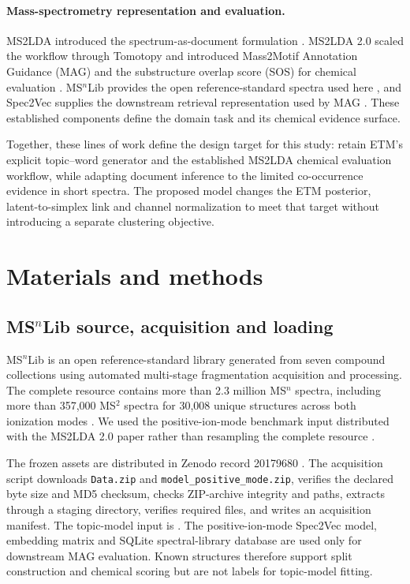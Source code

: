 \documentclass[10pt,a4paper]{article}
\begin{document}
\paragraph{Mass-spectrometry representation and evaluation.}
MS2LDA introduced the spectrum-as-document formulation
\cite{vanderhooft2016}. MS2LDA 2.0 scaled the workflow through Tomotopy and
introduced Mass2Motif Annotation Guidance (MAG) and the substructure overlap
score (SOS) for chemical evaluation \cite{torresortega2026}. MS$^{n}$Lib
provides the open reference-standard spectra used here \cite{brungs2025}, and
Spec2Vec supplies the downstream retrieval representation used by MAG
\cite{huber2021}. These established components define the domain task and its
chemical evidence surface.

Together, these lines of work define the design target for this study: retain
ETM's explicit topic--word generator and the established MS2LDA chemical
evaluation workflow, while adapting document inference to the limited
co-occurrence evidence in short spectra. The proposed model changes the ETM
posterior, latent-to-simplex link and channel normalization to meet that target
without introducing a
separate clustering objective.

\section{Materials and methods}

\subsection{MS\texorpdfstring{$^{n}$}{n}Lib source, acquisition and loading}

MS$^{n}$Lib is an open reference-standard library generated from seven compound
collections using automated multi-stage fragmentation acquisition and
processing. The complete resource contains more than 2.3 million MS$^{n}$
spectra, including more than 357,000 MS$^{2}$ spectra for 30,008 unique
structures across both ionization modes \cite{brungs2025}. We used the
positive-ion-mode benchmark input distributed with the MS2LDA 2.0 paper rather than
resampling the complete resource \cite{torresortega2026}.

The frozen assets are distributed in Zenodo record 20179680
\cite{msnlibdata}. The acquisition script downloads \texttt{Data.zip} and
\texttt{model\_positive\_mode.zip}, verifies the declared byte size and MD5
checksum, checks ZIP-archive integrity and paths, extracts through a staging
directory, verifies required files, and writes an acquisition manifest. The topic-model input is
. The
positive-ion-mode Spec2Vec model, embedding matrix and SQLite spectral-library
database are used only for downstream MAG evaluation. Known structures
therefore support split construction and chemical scoring but are not labels
for topic-model fitting.
\end{document}

